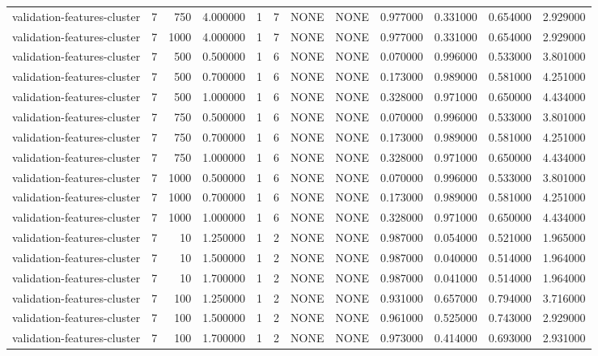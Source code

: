 \begin{tabular}{lrrrllllrrrr}
validation-features-cluster & 7 & 750 & 4.000000 & 1 & 7 & NONE & NONE & 0.977000 & 0.331000 & 0.654000 & 2.929000 \\
validation-features-cluster & 7 & 1000 & 4.000000 & 1 & 7 & NONE & NONE & 0.977000 & 0.331000 & 0.654000 & 2.929000 \\
validation-features-cluster & 7 & 500 & 0.500000 & 1 & 6 & NONE & NONE & 0.070000 & 0.996000 & 0.533000 & 3.801000 \\
validation-features-cluster & 7 & 500 & 0.700000 & 1 & 6 & NONE & NONE & 0.173000 & 0.989000 & 0.581000 & 4.251000 \\
validation-features-cluster & 7 & 500 & 1.000000 & 1 & 6 & NONE & NONE & 0.328000 & 0.971000 & 0.650000 & 4.434000 \\
validation-features-cluster & 7 & 750 & 0.500000 & 1 & 6 & NONE & NONE & 0.070000 & 0.996000 & 0.533000 & 3.801000 \\
validation-features-cluster & 7 & 750 & 0.700000 & 1 & 6 & NONE & NONE & 0.173000 & 0.989000 & 0.581000 & 4.251000 \\
validation-features-cluster & 7 & 750 & 1.000000 & 1 & 6 & NONE & NONE & 0.328000 & 0.971000 & 0.650000 & 4.434000 \\
validation-features-cluster & 7 & 1000 & 0.500000 & 1 & 6 & NONE & NONE & 0.070000 & 0.996000 & 0.533000 & 3.801000 \\
validation-features-cluster & 7 & 1000 & 0.700000 & 1 & 6 & NONE & NONE & 0.173000 & 0.989000 & 0.581000 & 4.251000 \\
validation-features-cluster & 7 & 1000 & 1.000000 & 1 & 6 & NONE & NONE & 0.328000 & 0.971000 & 0.650000 & 4.434000 \\
validation-features-cluster & 7 & 10 & 1.250000 & 1 & 2 & NONE & NONE & 0.987000 & 0.054000 & 0.521000 & 1.965000 \\
validation-features-cluster & 7 & 10 & 1.500000 & 1 & 2 & NONE & NONE & 0.987000 & 0.040000 & 0.514000 & 1.964000 \\
validation-features-cluster & 7 & 10 & 1.700000 & 1 & 2 & NONE & NONE & 0.987000 & 0.041000 & 0.514000 & 1.964000 \\
validation-features-cluster & 7 & 100 & 1.250000 & 1 & 2 & NONE & NONE & 0.931000 & 0.657000 & 0.794000 & 3.716000 \\
validation-features-cluster & 7 & 100 & 1.500000 & 1 & 2 & NONE & NONE & 0.961000 & 0.525000 & 0.743000 & 2.929000 \\
validation-features-cluster & 7 & 100 & 1.700000 & 1 & 2 & NONE & NONE & 0.973000 & 0.414000 & 0.693000 & 2.931000 \\

\end{tabular}
